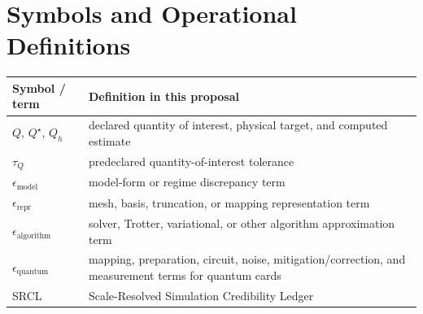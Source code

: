 \documentclass[conference]{../../../../Conference-LaTeX-template_10-17-19/IEEEtran}
\begin{document}
\section{Symbols and Operational Definitions}
\begin{tabularx}{0.96\columnwidth}{lY}
\toprule
Symbol / term & Definition in this proposal \\
\midrule
$Q$, $Q^\star$, $Q_h$ & declared quantity of interest, physical target, and computed estimate \\
$\tau_Q$ & predeclared quantity-of-interest tolerance \\
$\epsilon_{\mathrm{model}}$ & model-form or regime discrepancy term \\
$\epsilon_{\mathrm{repr}}$ & mesh, basis, truncation, or mapping representation term \\
$\epsilon_{\mathrm{algorithm}}$ & solver, Trotter, variational, or other algorithm approximation term \\
$\epsilon_{\mathrm{quantum}}$ & mapping, preparation, circuit, noise, mitigation/correction, and measurement terms for quantum cards \\
SRCL & Scale-Resolved Simulation Credibility Ledger \\
\bottomrule
\end{tabularx}
\end{document}
